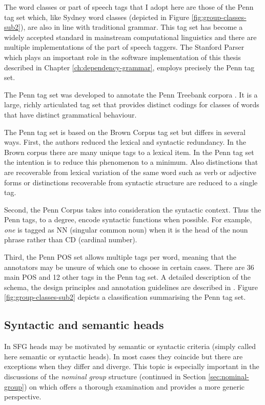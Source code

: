 The word classes or part of speech tags that I adopt here are those of the Penn tag set \citep{Marcus1993} which, like Sydney word classes (depicted in Figure \ref{fig:group-classes-sub2}), are also in line with traditional grammar. This tag set has become a widely accepted standard in mainstream computational linguistics and there are multiple implementations of the part of speech taggers. The Stanford Parser which plays an important role in the software implementation of this thesis described in Chapter \ref{ch:dependency-grammar}, employs precisely the Penn tag set.

The Penn tag set was developed to annotate the Penn Treebank corpora \citep{Marcus1993}. It is a large, richly articulated tag set that provides distinct codings for classes of words that have distinct grammatical behaviour.

The Penn tag set is based on the Brown Corpus tag set \citep{Kucera1968} but differs in several ways. First, the authors reduced the lexical and syntactic redundancy. In the Brown corpus there are many unique tags to a lexical item. In the Penn tag set the intention is to reduce this phenomenon to a minimum. Also distinctions that are recoverable from lexical variation of the same word such as verb or adjective forms or distinctions recoverable from syntactic structure are reduced to a single tag. 

Second, the Penn Corpus takes into consideration the syntactic context. Thus the Penn tags, to a degree, encode syntactic functions when possible. For example, \textit{one} is tagged as NN (singular common noun) when it is the head of the noun phrase rather than CD (cardinal number). 

Third, the Penn POS set allows multiple tags per word, meaning that the annotators may be unsure of which one to choose in certain cases. There are 36 main POS and 12 other tags in the Penn tag set. A detailed description of the schema, the design principles and annotation guidelines are described in \citet{Santorini1990}. Figure \ref{fig:group-classes-sub2} depicts a classification summarising the Penn tag set. 



\subsection{Syntactic and semantic heads}
\label{sec:heads}
In SFG heads may be motivated by semantic or syntactic criteria (simply called here semantic or syntactic heads). In most cases they coincide but there are exceptions when they differ and diverge. This topic is especially important in the discussions of the \textit{nominal group} structure (continued in Section \ref{sec:nominal-group}) on which \citet{Halliday2013} offers a thorough examination and \citet{Fawcett2000} provides a more generic perspective.

